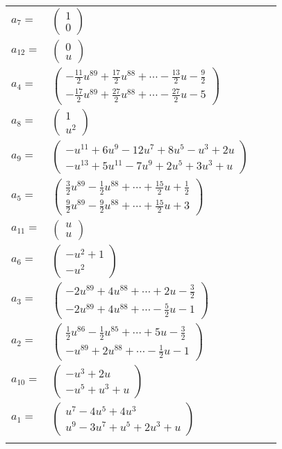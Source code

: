 \documentclass[1p]{elsarticle_modified}
\theoremstyle{definition}
\begin{document}
\begin{tabular}{m{7pt} m{180pt} m{7pt} m{180pt} }
\flushright $a_{7}=$&$\begin{pmatrix}1\\0\end{pmatrix}$ \\
\flushright $a_{12}=$&$\begin{pmatrix}0\\u\end{pmatrix}$ \\
\flushright $a_{4}=$&$\begin{pmatrix}-\frac{11}{2} u^{89}+\frac{17}{2} u^{88}+\cdots-\frac{13}{2} u-\frac{9}{2}\\-\frac{17}{2} u^{89}+\frac{27}{2} u^{88}+\cdots-\frac{27}{2} u-5\end{pmatrix}$ \\
\flushright $a_{8}=$&$\begin{pmatrix}1\\u^2\end{pmatrix}$ \\
\flushright $a_{9}=$&$\begin{pmatrix}- u^{11}+6 u^9-12 u^7+8 u^5- u^3+2 u\\- u^{13}+5 u^{11}-7 u^9+2 u^5+3 u^3+u\end{pmatrix}$ \\
\flushright $a_{5}=$&$\begin{pmatrix}\frac{3}{2} u^{89}-\frac{1}{2} u^{88}+\cdots+\frac{15}{2} u+\frac{1}{2}\\\frac{9}{2} u^{89}-\frac{9}{2} u^{88}+\cdots+\frac{15}{2} u+3\end{pmatrix}$ \\
\flushright $a_{11}=$&$\begin{pmatrix}u\\u\end{pmatrix}$ \\
\flushright $a_{6}=$&$\begin{pmatrix}- u^2+1\\- u^2\end{pmatrix}$ \\
\flushright $a_{3}=$&$\begin{pmatrix}-2 u^{89}+4 u^{88}+\cdots+2 u-\frac{3}{2}\\-2 u^{89}+4 u^{88}+\cdots-\frac{5}{2} u-1\end{pmatrix}$ \\
\flushright $a_{2}=$&$\begin{pmatrix}\frac{1}{2} u^{86}-\frac{1}{2} u^{85}+\cdots+5 u-\frac{3}{2}\\- u^{89}+2 u^{88}+\cdots-\frac{1}{2} u-1\end{pmatrix}$ \\
\flushright $a_{10}=$&$\begin{pmatrix}- u^3+2 u\\- u^5+u^3+u\end{pmatrix}$ \\
\flushright $a_{1}=$&$\begin{pmatrix}u^7-4 u^5+4 u^3\\u^9-3 u^7+u^5+2 u^3+u\end{pmatrix}$\\&\end{tabular}
\end{document}
